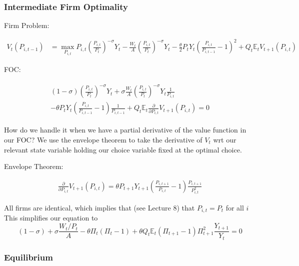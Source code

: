 \documentclass[10pt]{article}
\begin{document}
\subsubsection{Intermediate Firm Optimality}

Firm Problem:

\begin{align}
        V_t\left(P_{i, t-1}\right) & =\max _{P_{i, t}} P_{i, t}\left(\frac{P_{i, t}}{P_t}\right)^{-\sigma} Y_t-\frac{W_t}{A}\left(\frac{P_{i, t}}{P_t}\right)^{-\sigma} Y_t-\frac{\theta}{2} P_t Y_t\left(\frac{P_{i, t}}{P_{i, t-1}}-1\right)^2 
        +Q_t \mathbb{E}_t V_{t+1}\left(P_{i, t}\right)
\end{align}

FOC:

\begin{align}
    \begin{gathered}
        (1-\sigma)\left(\frac{P_{i, t}}{P_t}\right)^{-\sigma} Y_t+\sigma \frac{W_t}{A}\left(\frac{P_{i, t}}{P_t}\right)^{-\sigma} Y_t \frac{1}{P_{i, t}} \\
        -\theta P_t Y_t\left(\frac{P_{i, t}}{P_{i, t-1}}-1\right) \frac{1}{P_{i, t-1}}+Q_t \mathbb{E}_t \frac{\partial}{\partial P_{i, t}} V_{t+1}\left(P_{i, t}\right)=0
        \end{gathered}
\end{align}

How do we handle it when we have a partial derivative of the value function 
in our FOC? We use the envelope theorem to take the derivative 
of $V_t$ wrt our relevant state variable holding our choice variable 
fixed at the optimal choice.

Envelope Theorem:

\begin{align}
    \frac{\partial}{\partial P_{i, t}} V_{t+1}\left(P_{i, t}\right)=\theta P_{t+1} Y_{t+1}\left(\frac{P_{i, t+1}}{P_{i, t}}-1\right) \frac{P_{i, t+1}}{P_{i, t}^2}
\end{align}

All firms are identical, which implies that (see Lecture 8) that $P_{i, t}=P_t$ for all $i$
This simplifies our equation to
$$
(1-\sigma)+\sigma \frac{W_t / P_t}{A}-\theta \Pi_t\left(\Pi_t-1\right)+\theta Q_t \mathbb{E}_t\left(\Pi_{t+1}-1\right) \Pi_{t+1}^2 \frac{Y_{t+1}}{Y_t}=0
$$

\subsubsection{Equilibrium}
\end{document}
